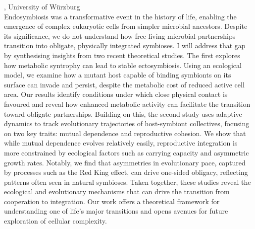 \documentclass[12pt,a4paper]{article}
\begin{document}
\bigskip\bigskip

, University of Würzburg \\[2ex] Endosymbiosis was a transformative event in the history of life, enabling the emergence of complex eukaryotic cells from simpler microbial ancestors. Despite its significance, we do not understand how free-living microbial partnerships transition into obligate, physically integrated symbioses. I will address that gap by synthesising insights from two recent theoretical studies. The first explores how metabolic syntrophy can lead to stable ectosymbiosis. Using an ecological model, we examine how a mutant host capable of binding symbionts on its surface can invade and persist, despite the metabolic cost of reduced active cell area. Our results identify conditions under which close physical contact is favoured and reveal how enhanced metabolic activity can facilitate the transition toward obligate partnerships. Building on this, the second study uses adaptive dynamics to track evolutionary trajectories of host-symbiont collectives, focusing on two key traits: mutual dependence and reproductive cohesion. We show that while mutual dependence evolves relatively easily, reproductive integration is more constrained by ecological factors such as carrying capacity and asymmetric growth rates. Notably, we find that asymmetries in evolutionary pace, captured by processes such as the Red King effect, can drive one-sided obligacy, reflecting patterns often seen in natural symbioses. Taken together, these studies reveal the ecological and evolutionary mechanisms that can drive the transition from cooperation to integration. Our work offers a theoretical framework for understanding one of life’s major transitions and opens avenues for future exploration of cellular complexity. 

\bigskip\bigskip

\newpage
\end{document}

